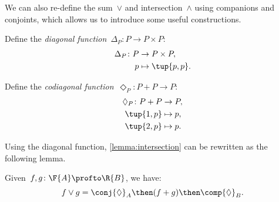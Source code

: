 We can also re-define the sum~$\vee$ and intersection~$\wedge$ using companions and conjoints, which allows us to introduce some useful constructions.

\begin{definition}
  Define the \emph{diagonal function}~$\Delta_P\colon P \to P \times P$:
  \begin{equation}
    \begin{aligned}
      \Delta_P \colon P & \to P \times P, \\
      p & \mapsto \tup{p, p}.
    \end{aligned}
  \end{equation}
\end{definition}

\begin{definition}
  Define the \emph{codiagonal function}~$\Diamond_P\colon P+P \to P $:
  \begin{equation}
    \begin{aligned}
      \Diamond_P \colon P + P & \to P,  \\
      \tup{1,p} & \mapsto p, \\
      \tup{2,p} & \mapsto p.
    \end{aligned}
  \end{equation}
\end{definition}

\noindent Using the diagonal function, \cref{lemma:intersection} can be rewritten as the following lemma.

\begin{lemma}
  Given~$f, g\colon \F{A} \profto \R{B}$, we have:
  \begin{equation}
    f \vee g =  \conj{\Diamond}_A \then (f + g)\then \comp{\Diamond}_B.
  \end{equation}
\end{lemma}

